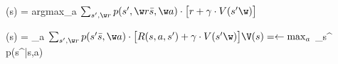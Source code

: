 \documentclass[11pt]{article}
\begin{document}
 
\normalsize \pi(s) = argmax_a $ \sum_{s^\prime,\w r } p(s^\prime ,\w r \bar  s,\w a)\cdot\big[ r+ \large\gamma \normalsize \cdot V( s^\prime \w ) \big] $

\normalsize \V(s) = \leftarrow \max_{a} $ \sum_{s^\prime,\w r } p(s^\prime \bar  s,\w a)\cdot\big[ R(s,a,s') + \large\gamma \normalsize \cdot V( s^\prime \w ) \big]

\normalsize \V(s) = \leftarrow \max_{a} $ \sum_{s^\prime} p(s^\prime \bar  s,\w a)
\end{document}
